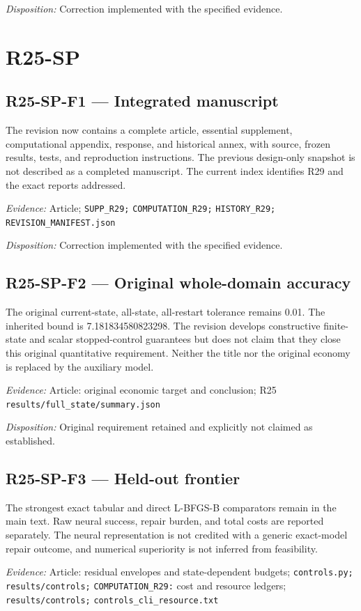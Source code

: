 \emph{Disposition:} Correction implemented with the specified evidence.
\section{R25-SP}
\subsection{R25-SP-F1 --- Integrated manuscript}
The revision now contains a complete article, essential supplement, computational appendix, response, and historical annex, with source, frozen results, tests, and reproduction instructions. The previous design-only snapshot is not described as a completed manuscript. The current index identifies R29 and the exact reports addressed.

\emph{Evidence:} Article; \nolinkurl{SUPP_R29;} \nolinkurl{COMPUTATION_R29;} \nolinkurl{HISTORY_R29;} \nolinkurl{REVISION_MANIFEST.json}

\emph{Disposition:} Correction implemented with the specified evidence.
\subsection{R25-SP-F2 --- Original whole-domain accuracy}
The original current-state, all-state, all-restart tolerance remains 0.01. The inherited bound is 7.181834580823298. The revision develops constructive finite-state and scalar stopped-control guarantees but does not claim that they close this original quantitative requirement. Neither the title nor the original economy is replaced by the auxiliary model.

\emph{Evidence:} Article: original economic target and conclusion; R25 \nolinkurl{results/full_state/summary.json}

\emph{Disposition:} Original requirement retained and explicitly not claimed as established.
\subsection{R25-SP-F3 --- Held-out frontier}
The strongest exact tabular and direct L-BFGS-B comparators remain in the main text. Raw neural success, repair burden, and total costs are reported separately. The neural representation is not credited with a generic exact-model repair outcome, and numerical superiority is not inferred from feasibility.

\emph{Evidence:} Article: residual envelopes and state-dependent budgets; \nolinkurl{controls.py;} \nolinkurl{results/controls;} \nolinkurl{COMPUTATION_R29:} cost and resource ledgers; \nolinkurl{results/controls;} \nolinkurl{controls_cli_resource.txt}

